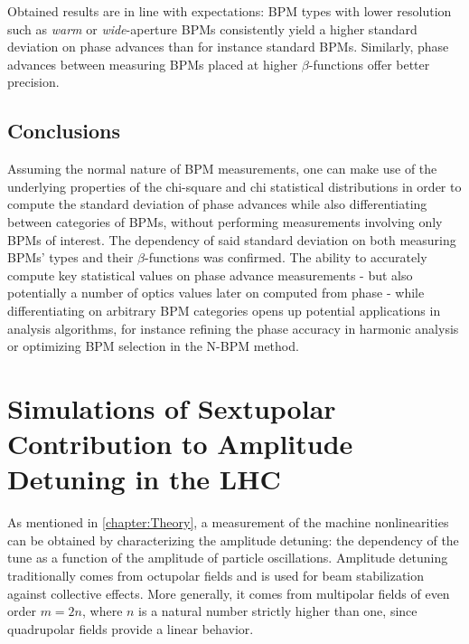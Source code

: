 Obtained results are in line with expectations: BPM types with lower resolution such as \textit{warm} or \textit{wide}-aperture BPMs consistently yield a higher standard deviation on phase advances than for instance standard BPMs.
Similarly, phase advances between measuring BPMs placed at higher \(\beta\)-functions offer better precision.

\subsection*{Conclusions}

Assuming the normal nature of BPM measurements, one can make use of the underlying properties of the chi-square and chi statistical distributions in order to compute the standard deviation of phase advances while also differentiating between categories of BPMs, without performing measurements involving only BPMs of interest.
The dependency of said standard deviation on both measuring BPMs' types and their \(\beta\)-functions was confirmed.
The ability to accurately compute key statistical values on phase advance measurements - but also potentially a number of optics values later on computed from phase - while differentiating on arbitrary BPM categories opens up potential applications in analysis algorithms, for instance refining the phase accuracy in harmonic analysis or optimizing BPM selection in the N-BPM method.

\section{Simulations of Sextupolar Contribution to Amplitude Detuning in the LHC}


As mentioned in \cref{chapter:Theory}, a measurement of the machine nonlinearities can be obtained by characterizing the amplitude detuning: the dependency of the tune as a function of the amplitude of particle oscillations.
Amplitude detuning traditionally comes from octupolar fields and is used for beam stabilization against collective effects.
More generally, it comes from multipolar fields of even order \(m = 2n\), where \(n\) is a natural number strictly higher than one, since quadrupolar fields provide a linear behavior.

